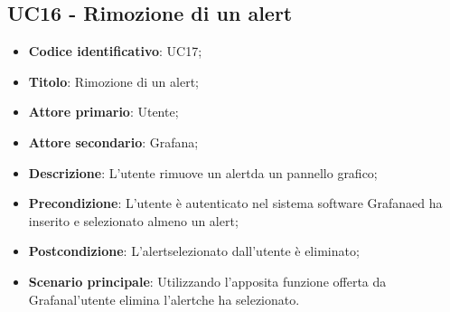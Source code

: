 \subsection{UC16 - Rimozione di un alert}
\begin{itemize}
	\item \textbf{Codice identificativo}: UC17;
	\item \textbf{Titolo}: Rimozione di un alert\glo;
	\item \textbf{Attore primario}: Utente;
	\item \textbf{Attore secondario}: Grafana\glo;
	\item \textbf{Descrizione}: L'utente rimuove un alert\glosp da un pannello grafico;
	\item \textbf{Precondizione}: L'utente è autenticato nel sistema software Grafana\glosp ed ha inserito e selezionato almeno un alert\glo;
	\item \textbf{Postcondizione}: L'alert\glosp selezionato dall'utente è eliminato;
	\item \textbf{Scenario principale}: Utilizzando l'apposita funzione offerta da Grafana\glosp l'utente elimina l'alert\glosp che ha selezionato.
\end{itemize} 
